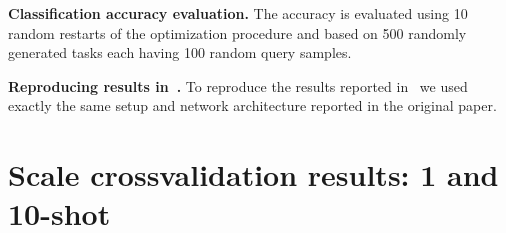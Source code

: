 \documentclass{article}
\begin{document}
\textbf{Classification accuracy evaluation.} The accuracy is evaluated using 10 random restarts of the optimization procedure and based on 500 randomly generated tasks each having 100 random query samples.

\textbf{Reproducing results in~\citep{snell2017prototypical}.} To reproduce the results reported in~\citep{snell2017prototypical} we used exactly the same setup and network architecture reported in the original paper.







\iffalse

\section{Scale crossvalidation results: 1 and 10-shot} \label{sec:one_shot_alpha_results}
\end{document}
